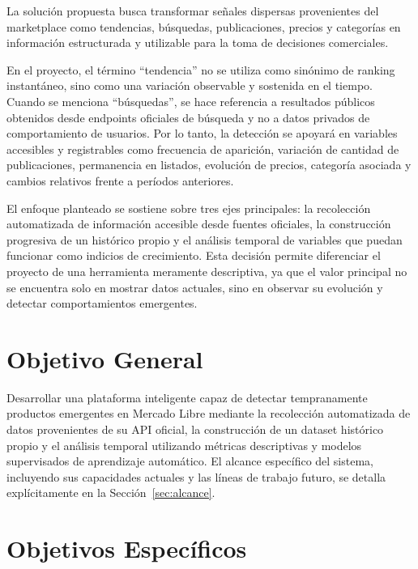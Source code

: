 La solución propuesta busca transformar señales dispersas provenientes del marketplace como tendencias, búsquedas, publicaciones, precios y categorías en información estructurada y utilizable para la toma de decisiones comerciales.

En el proyecto, el término ``tendencia'' no se utiliza como sinónimo de ranking instantáneo, sino como una variación observable y sostenida en el tiempo. Cuando se menciona ``búsquedas'', se hace referencia a resultados públicos obtenidos desde endpoints oficiales de búsqueda y no a datos privados de comportamiento de usuarios. Por lo tanto, la detección se apoyará en variables accesibles y registrables como frecuencia de aparición, variación de cantidad de publicaciones, permanencia en listados, evolución de precios, categoría asociada y cambios relativos frente a períodos anteriores.

El enfoque planteado se sostiene sobre tres ejes principales: la recolección automatizada de información accesible desde fuentes oficiales, la construcción progresiva de un histórico propio y el análisis temporal de variables que puedan funcionar como indicios de crecimiento. Esta decisión permite diferenciar el proyecto de una herramienta meramente descriptiva, ya que el valor principal no se encuentra solo en mostrar datos actuales, sino en observar su evolución y detectar comportamientos emergentes.

\section{Objetivo General}\label{sec:objetivo-general}

Desarrollar una plataforma inteligente capaz de detectar tempranamente productos emergentes en Mercado Libre mediante la recolección automatizada de datos provenientes de su API oficial, la construcción de un dataset histórico propio y el análisis temporal utilizando métricas descriptivas y modelos supervisados de aprendizaje automático. El alcance específico del sistema, incluyendo sus capacidades actuales y las líneas de trabajo futuro, se detalla explícitamente en la Sección~\ref{sec:alcance}.

\section{Objetivos Específicos}\label{sec:objetivos-especificos}

